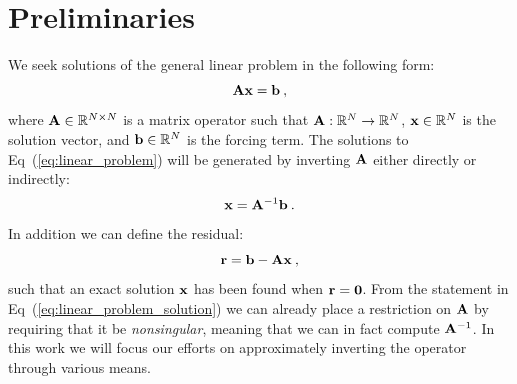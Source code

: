 \section{Preliminaries}
\label{sec:linear_preliminaries}
We seek solutions of the general linear problem in the following form:
\begin{equation}
  \mathbf{A} \mathbf{x} = \mathbf{b}\:,
  \label{eq:linear_problem}
\end{equation}
where $\mathbf{A} \in \mathbb{R}^{N \times N}$ is a matrix operator such
that $\mathbf{A} : \mathbb{R}^{N} \rightarrow \mathbb{R}^{N}$, $\mathbf{x} \in
\mathbb{R}^N$ is the solution vector, and $\mathbf{b} \in \mathbb{R}^N$ is
the forcing term. The solutions to Eq~(\ref{eq:linear_problem}) will
be generated by inverting $\mathbf{A}$ either directly or indirectly:
\begin{equation}
  \mathbf{x} = \mathbf{A}^{-1} \mathbf{b}
  \label{eq:linear_problem_solution}\:.
\end{equation}
In addition we can define the residual:
\begin{equation}
  \mathbf{r} = \mathbf{b} - \mathbf{A}\mathbf{x}\:,
  \label{eq:linear_residual}
\end{equation}
such that an exact solution $\mathbf{x}$ has been found when
$\mathbf{r}=\mathbf{0}$.  From the statement in
Eq~(\ref{eq:linear_problem_solution}) we can already place a
restriction on $\mathbf{A}$ by requiring that it be \textit{nonsingular},
meaning that we can in fact compute $\mathbf{A}^{-1}$. In this work we
will focus our efforts on approximately inverting the operator through
various means.

